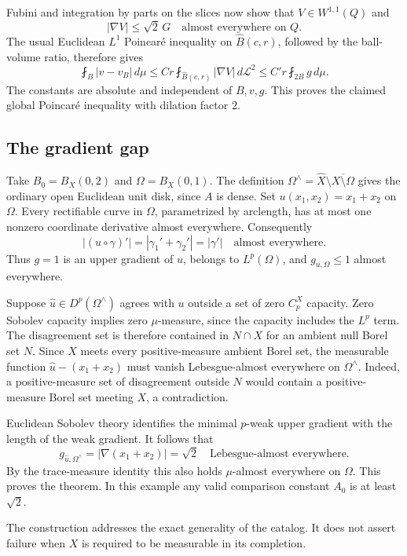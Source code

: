 \documentclass[11pt,a4paper]{article}
\theoremstyle{remark}
\begin{document}
Fubini and integration by parts on the slices now show that
$V\in W^{1,1}(Q)$ and
\[
 |\nabla V|\le\sqrt2\,G\quad\text{almost everywhere on }Q.
\]
The usual Euclidean $L^1$ Poincar\'e inequality on $\widehat B(c,r)$,
followed by the ball-volume ratio, therefore gives
\[
 \fint_B|v-v_B|\,d\mu
 \le C r\fint_{\widehat B(c,r)}|\nabla V|\,d\mathcal L^2
 \le C' r\fint_{2B}g\,d\mu.
\]
The constants are absolute and independent of $B,v,g$.  This proves the
claimed global Poincar\'e inequality with dilation factor $2$.

\subsection{The gradient gap}

Take $B_0=B_X(0,2)$ and $\Omega=B_X(0,1)$.  The definition
$\Omega^\wedge=\widehat X\setminus\overline{X\setminus\Omega}$ gives
the ordinary open Euclidean unit disk, since $A$ is dense.  Set
$u(x_1,x_2)=x_1+x_2$ on $\Omega$.  Every rectifiable curve in $\Omega$,
parametrized by arclength, has at most one nonzero coordinate derivative
almost everywhere.  Consequently
\[
 |(u\circ\gamma)'|
       =|\gamma_1'+\gamma_2'|=|\gamma'|
       \quad\text{almost everywhere}.
\]
Thus $g=1$ is an upper gradient of $u$, belongs to $L^p(\Omega)$, and
$g_{u,\Omega}\le1$ almost everywhere.

Suppose $\widehat u\in D^p(\Omega^\wedge)$ agrees with $u$ outside a
set of zero $C_p^X$ capacity.  Zero Sobolev capacity implies zero
$\mu$-measure, since the capacity includes the $L^p$ term.  The
disagreement set is therefore contained in $N\cap X$ for an ambient
null Borel set $N$.  Since $X$ meets every positive-measure ambient Borel
set, the measurable function $\widehat u-(x_1+x_2)$ must vanish
Lebesgue-almost everywhere on $\Omega^\wedge$.  Indeed, a positive-measure
set of disagreement outside $N$ would contain a positive-measure Borel
set meeting $X$, a contradiction.

Euclidean Sobolev theory identifies the minimal $p$-weak upper gradient
with the length of the weak gradient.  It follows that
\[
 g_{\widehat u,\Omega^\wedge}
       =|\nabla(x_1+x_2)|=\sqrt2
       \quad\text{Lebesgue-almost everywhere}.
\]
By the trace-measure identity this also holds $\mu$-almost everywhere on
$\Omega$.  This proves the theorem.  In this example any valid comparison
constant $A_0$ is at least $\sqrt2$.

The construction addresses the exact generality of the catalog.  It
does not assert failure when $X$ is required to be measurable in its
completion.
\end{document}
